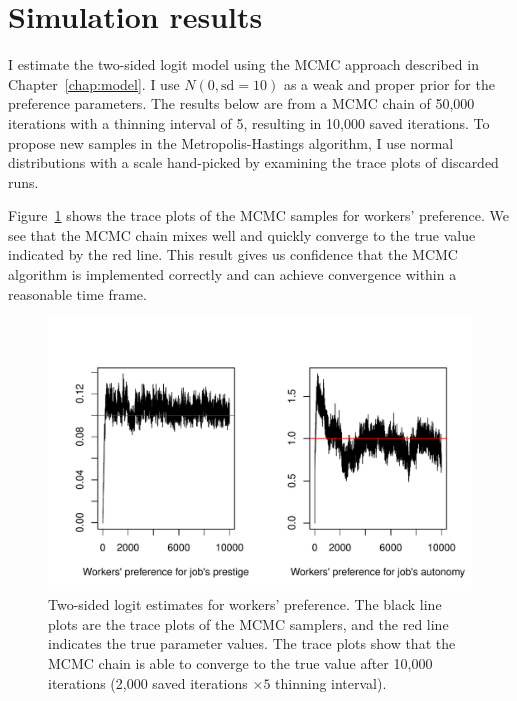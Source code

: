 \section{Simulation results}

I estimate the two-sided logit model using the MCMC approach described in
Chapter~\ref{chap:model}. I use $N(0, \text{sd}=10)$ as a weak and proper prior for the preference
parameters. The results below are from a MCMC chain of 50,000
iterations with a thinning interval of 5, resulting in 10,000 saved iterations.
To propose new samples in the Metropolis-Hastings algorithm, I use normal
distributions with a scale hand-picked by examining the trace plots of discarded runs.

Figure~\ref{fig:sim_labor_nojobs_alpha} shows the trace plots of the MCMC
samples for workers' preference. We see that the MCMC chain mixes well and
quickly converge to the true value indicated by the red line. This result gives
us confidence that the MCMC algorithm is implemented correctly and can achieve
convergence within a reasonable time frame.

\begin{figure}[!ht]
  \centering
  \includegraphics[width=\textwidth,keepaspectratio]{../figure/sim_labor_nojobs_alpha}
  \caption[Simulation, estimate for workers' preference]{Two-sided logit estimates for workers' preference. The black line
    plots are the trace plots of the MCMC samplers, and the red line indicates the
    true parameter values. The trace plots show that the MCMC chain is able to
    converge to the true value after 10,000 iterations (2,000 saved iterations $\times 5$ thinning interval).}
  \label{fig:sim_labor_nojobs_alpha}
\end{figure}

